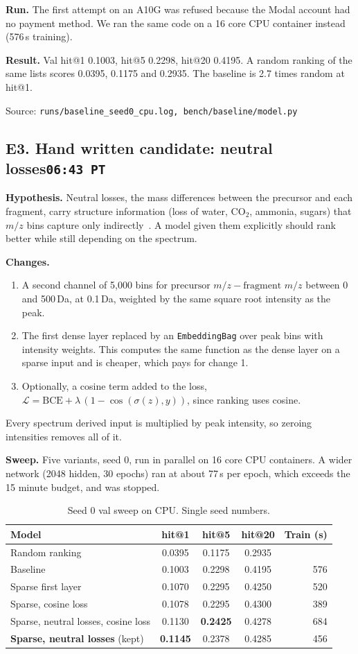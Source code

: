 \documentclass[11pt]{article}
\newcommand{\entry}[2]{\subsection*{#1\hfill{\normalfont\small\texttt{#2}}}}
\newcommand{\src}[1]{{\small\color{black!60}Source: \texttt{#1}}}
\begin{document}
\textbf{Run.} The first attempt on an A10G was refused because the Modal account had no payment method. We ran the
same code on a 16 core CPU container instead (576\,s training).

\textbf{Result.} Val hit@1 0.1003, hit@5 0.2298, hit@20 0.4195. A random ranking of the same lists scores
0.0395, 0.1175 and 0.2935. The baseline is 2.7 times random at hit@1.

\src{runs/baseline\_seed0\_cpu.log, bench/baseline/model.py}

\entry{E3. Hand written candidate: neutral losses}{06:43 PT}

\textbf{Hypothesis.} Neutral losses, the mass differences between the precursor and each fragment, carry structure
information (loss of water, CO$_2$, ammonia, sugars) that $m/z$ bins capture only indirectly~\cite{neutralloss}. A
model given them explicitly should rank better while still depending on the spectrum.

\textbf{Changes.}
\begin{enumerate}
  \item A second channel of 5{,}000 bins for $\text{precursor } m/z - \text{fragment } m/z$ between 0 and 500\,Da, at
        0.1\,Da, weighted by the same square root intensity as the peak.
  \item The first dense layer replaced by an \texttt{EmbeddingBag} over peak bins with intensity weights. This computes
        the same function as the dense layer on a sparse input and is cheaper, which pays for change 1.
  \item Optionally, a cosine term added to the loss,
        $\mathcal{L} = \text{BCE} + \lambda\,(1 - \cos(\sigma(z), y))$, since ranking uses cosine.
\end{enumerate}
Every spectrum derived input is multiplied by peak intensity, so zeroing intensities removes all of it.

\textbf{Sweep.} Five variants, seed 0, run in parallel on 16 core CPU containers. A wider network
(2048 hidden, 30 epochs) ran at about 77\,s per epoch, which exceeds the 15 minute budget, and was stopped.

\begin{table}[h]
\centering
\begin{tabular}{lcccr}
\toprule
Model & hit@1 & hit@5 & hit@20 & Train (s) \\
\midrule
Random ranking & 0.0395 & 0.1175 & 0.2935 & \\
Baseline & 0.1003 & 0.2298 & 0.4195 & 576 \\
Sparse first layer & 0.1070 & 0.2295 & 0.4250 & 520 \\
Sparse, cosine loss & 0.1078 & 0.2295 & 0.4300 & 389 \\
Sparse, neutral losses, cosine loss & 0.1130 & \textbf{0.2425} & 0.4278 & 684 \\
\textbf{Sparse, neutral losses} (kept) & \textbf{0.1145} & 0.2378 & 0.4285 & 456 \\
\bottomrule
\end{tabular}
\caption{Seed 0 val sweep on CPU. Single seed numbers.}
\label{tab:sweep}
\end{table}
\end{document}
